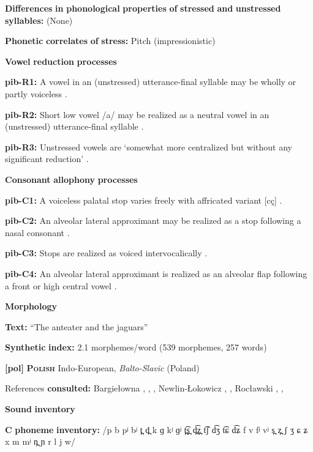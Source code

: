 \textbf{Differences} \textbf{in} \textbf{phonological} \textbf{properties} \textbf{of} \textbf{stressed} \textbf{and} \textbf{unstressed} \textbf{syllables:} (None)

\textbf{Phonetic} \textbf{correlates} \textbf{of} \textbf{stress:} Pitch (impressionistic)

\textbf{Vowel} \textbf{reduction} \textbf{processes}

\textbf{pib-R1:} A vowel in an (unstressed) utterance-final syllable may be wholly or partly voiceless \citep[23]{Matteson1965}.

\textbf{pib-R2:} Short low vowel /a/ may be realized as a neutral vowel in an (unstressed) utterance-final syllable \citep[23]{Matteson1965}.

\textbf{pib-R3:} Unstressed vowels are ‘somewhat more centralized but without any significant reduction’ \citep[16]{Hanson2010}.

\textbf{Consonant} \textbf{allophony} \textbf{processes}

\textbf{pib-C1:} A voiceless palatal stop varies freely with affricated variant [cç] \citep[17]{Hanson2010}.

\textbf{pib-C2:} An alveolar lateral approximant may be realized as a stop following a nasal consonant \citep[24]{Hanson2010}.

\textbf{pib-C3:} Stops are realized as voiced intervocalically \citep[17]{Hanson2010}.

\textbf{pib-C4:} An alveolar lateral approximant is realized as an alveolar flap following a front or high central vowel \citep[24]{Hanson2010}.

\textbf{Morphology}

\textbf{Text:} “The anteater and the jaguars” \citep[379-386]{Hanson2010}

\textbf{Synthetic} \textbf{index:} 2.1 morphemes/word (539 morphemes, 257 words)

\textbf{[pol]}   \textbf{\textsc{Polish}}  Indo-European, \textit{Balto-Slavic} (Poland)

References \textbf{consulted:} Bargiełowna , \citet{Gussmann2007}, \citet{Jassem2003}, Newlin-Łokowicz , \citet{Nowak2006}, Rocławski , \citet{Rubach1974}, \citet{Zydorowicz2010}

\textbf{Sound} \textbf{inventory}

\textbf{C} \textbf{phoneme} \textbf{inventory:} /p b pʲ bʲ t̪ d̪ k ɡ kʲ ɡʲ t̪͡s̪ d̪͡z̪ t͡ʃ d͡ʒ t͡ɕ d͡ʑ f v fʲ vʲ s̪ z̪ ʃ ʒ ɕ ʑ x m mʲ n̪ ɲ r l j w/

